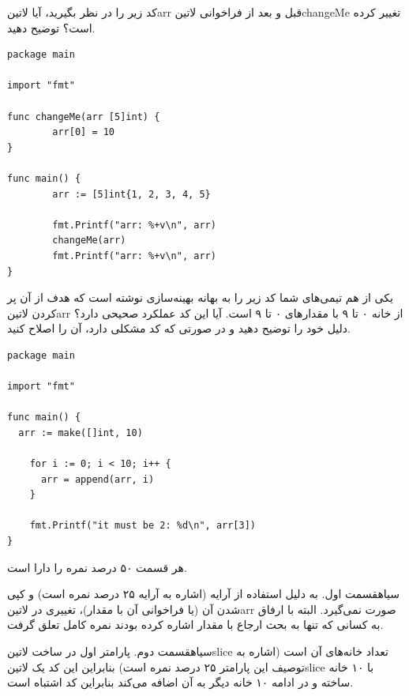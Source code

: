 

کد زیر را در نظر بگیرید، آیا ‌لاتین{arr} قبل و بعد از فراخوانی ‌لاتین{changeMe} تغییر کرده است؟ توضیح دهید.

\begin{latin}
\begin{verbatim}
package main

import "fmt"

func changeMe(arr [5]int) {
        arr[0] = 10
}

func main() {
        arr := [5]int{1, 2, 3, 4, 5}

        fmt.Printf("arr: %+v\n", arr)
        changeMe(arr)
        fmt.Printf("arr: %+v\n", arr)
}
\end{verbatim}
\end{latin}


یکی از هم تیمی‌های شما کد زیر را به بهانه بهینه‌سازی نوشته است که هدف
از آن پر کردن ‌لاتین{arr} از خانه ۰ تا ۹ با مقدارهای ۰ تا ۹ است.
آیا این کد عملکرد صحیحی دارد؟ دلیل خود را توضیح دهید و در صورتی
که کد مشکلی دارد، آن را اصلاح کنید.

\begin{latin}
\begin{verbatim}
package main

import "fmt"

func main() {
  arr := make([]int, 10)

    for i := 0; i < 10; i++ {
      arr = append(arr, i)
    }

    fmt.Printf("it must be 2: %d\n", arr[3])
}

\end{verbatim}
\end{latin}


\begin{پاسخ}

هر قسمت ۵۰ درصد نمره را دارا است.

‌سیاه{قسمت اول}.
به دلیل استفاده از آرایه (اشاره به آرایه ۲۵ درصد نمره است) و کپی شدن آن (یا فراخوانی آن با مقدار)، تغییری در ‌لاتین{arr} صورت نمی‌گیرد.
البته با ارفاق به کسانی که تنها به بحث ارجاع با مقدار اشاره کرده بودند نمره کامل تعلق گرفت.

‌سیاه{قسمت دوم}.
پارامتر اول در ساخت ‌لاتین{slice} تعداد خانه‌های آن است (اشاره به توصیف این پارامتر ۲۵ درصد نمره است) بنابراین این کد یک ‌لاتین{slice} با ۱۰ خانه ساخته و در ادامه ۱۰ خانه دیگر به آن اضافه می‌کند بنابراین
کد اشتباه است.

\end{پاسخ}
